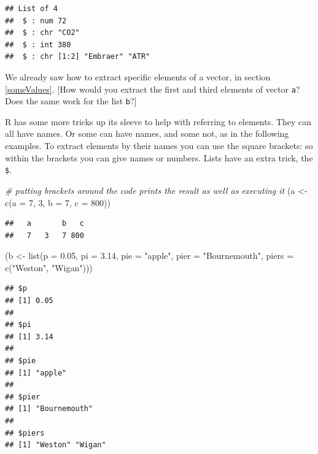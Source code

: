 \documentclass[
]{book}
\newenvironment{Shaded}{\begin{snugshade}}{\end{snugshade}}
\newcommand{\AttributeTok}[1]{\textcolor[rgb]{0.77,0.63,0.00}{#1}}
\newcommand{\CommentTok}[1]{\textcolor[rgb]{0.56,0.35,0.01}{\textit{#1}}}
\newcommand{\DecValTok}[1]{\textcolor[rgb]{0.00,0.00,0.81}{#1}}
\newcommand{\FloatTok}[1]{\textcolor[rgb]{0.00,0.00,0.81}{#1}}
\newcommand{\FunctionTok}[1]{\textcolor[rgb]{0.00,0.00,0.00}{#1}}
\newcommand{\NormalTok}[1]{#1}
\newcommand{\OtherTok}[1]{\textcolor[rgb]{0.56,0.35,0.01}{#1}}
\newcommand{\StringTok}[1]{\textcolor[rgb]{0.31,0.60,0.02}{#1}}
\begin{document}
\begin{verbatim}
## List of 4
##  $ : num 72
##  $ : chr "CO2"
##  $ : int 380
##  $ : chr [1:2] "Embraer" "ATR"
\end{verbatim}

We already saw how to extract specific elements of a vector, in section \ref{someValues}. {[}How would you extract the first and third elements of vector \texttt{a}? Does the same work for the list \texttt{b}?{]}

R has some more tricks up its sleeve to help with referring to elements. They can all have names. Or some can have names, and some not, as in the following examples. To extract elements by their names you can use the square brackets: so within the brackets you can give names or numbers. Lists have an extra trick, the \texttt{\$}.

\begin{Shaded}
\begin{Highlighting}[]
\CommentTok{\# putting brackets around the code prints the result as well as executing it}
\NormalTok{(a }\OtherTok{\textless{}{-}} \FunctionTok{c}\NormalTok{(}\AttributeTok{a =} \DecValTok{7}\NormalTok{, }\DecValTok{3}\NormalTok{, }\AttributeTok{b =} \DecValTok{7}\NormalTok{, }\AttributeTok{c =} \DecValTok{800}\NormalTok{))}
\end{Highlighting}
\end{Shaded}

\begin{verbatim}
##   a       b   c 
##   7   3   7 800
\end{verbatim}

\begin{Shaded}
\begin{Highlighting}[]
\NormalTok{(b }\OtherTok{\textless{}{-}} \FunctionTok{list}\NormalTok{(}\AttributeTok{p =} \FloatTok{0.05}\NormalTok{, }\AttributeTok{pi =} \FloatTok{3.14}\NormalTok{, }\AttributeTok{pie =} \StringTok{"apple"}\NormalTok{, }\AttributeTok{pier =} \StringTok{"Bournemouth"}\NormalTok{, }\AttributeTok{piers =} \FunctionTok{c}\NormalTok{(}\StringTok{"Weston"}\NormalTok{, }\StringTok{"Wigan"}\NormalTok{)))}
\end{Highlighting}
\end{Shaded}

\begin{verbatim}
## $p
## [1] 0.05
## 
## $pi
## [1] 3.14
## 
## $pie
## [1] "apple"
## 
## $pier
## [1] "Bournemouth"
## 
## $piers
## [1] "Weston" "Wigan"
\end{verbatim}
\end{document}
